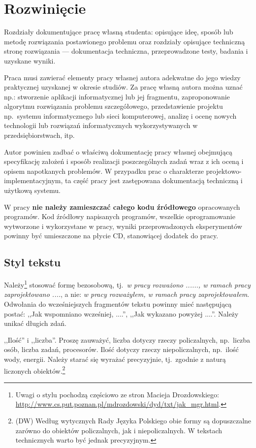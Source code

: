 
\chapter{Rozwinięcie}

Rozdziały dokumentujące pracę własną studenta: opisujące ideę, sposób lub metodę 
rozwiązania postawionego problemu oraz rozdziały opisujące techniczną stronę rozwiązania 
--- dokumentacja techniczna, przeprowadzone testy, badania i uzyskane wyniki. 

Praca musi zawierać elementy pracy własnej autora adekwatne do jego wiedzy praktycznej uzyskanej w
okresie studiów. Za pracę własną autora można uznać np.: stworzenie aplikacji informatycznej lub jej
fragmentu, zaproponowanie algorytmu rozwiązania problemu szczegółowego, przedstawienie projektu 
np.~systemu informatycznego lub sieci komputerowej, analizę i ocenę nowych technologii lub rozwiązań
informatycznych wykorzystywanych w przedsiębiorstwach, itp. 

Autor powinien zadbać o właściwą dokumentację pracy własnej obejmującą specyfikację założeń i 
sposób realizacji poszczególnych zadań
wraz z ich oceną i opisem napotkanych problemów. W przypadku prac o charakterze 
projektowo-implementacyjnym, ta część pracy jest zastępowana dokumentacją techniczną i użytkową systemu. 

W pracy \textbf{nie należy zamieszczać całego kodu źródłowego} opracowanych programów. Kod źródłowy napisanych
programów, wszelkie oprogramowanie wytworzone i wykorzystane w pracy, wyniki przeprowadzonych
eksperymentów powinny być umieszczone na płycie CD, stanowiącej dodatek do pracy.

\section*{Styl tekstu}

Należy\footnote{Uwagi o stylu pochodzą częściowo ze stron Macieja Drozdowskiego: \url{http://www.cs.put.poznan.pl/mdrozdowski/dyd/txt/jak_mgr.html}.} 
stosować formę bezosobową, tj.~\emph{w pracy rozważono ......, 
w ramach pracy zaprojektowano ....}, a nie: \emph{w pracy rozważyłem, w ramach pracy zaprojektowałem}. 
Odwołania do wcześniejszych fragmentów tekstu powinny mieć następującą postać: ,,Jak wspomniano wcześniej, ....'', 
,,Jak wykazano powyżej ....''. Należy unikać długich zdań. 

,,Ilość'' i ,,liczba''. Proszę zauważyć, liczba dotyczy rzeczy policzalnych, np.~liczba osób, liczba zadań, procesorów. 
Ilość dotyczy rzeczy niepoliczalnych, np.~ilość wody, energii. Należy starać się wyrażać precyzyjnie, tj.~zgodnie 
z naturą liczonych obiektów.\footnote{(DW) Według wytycznych Rady Języka Polskiego obie formy są dopuszczalne
zarówno do obiektów policzalnych, jak i niepoliczalnych. W tekstach technicznych warto być jednak precyzyjnym.}

